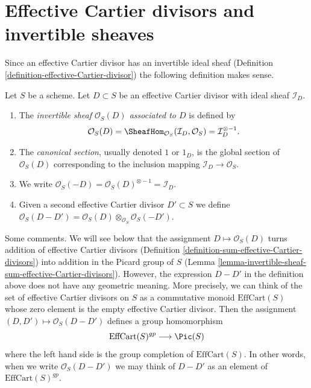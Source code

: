 \section{Effective Cartier divisors and invertible sheaves}
\label{section-effective-Cartier-invertible}

\noindent
Since an effective Cartier divisor has an invertible ideal sheaf
(Definition \ref{definition-effective-Cartier-divisor}) the
following definition makes sense.

\begin{definition}
\label{definition-invertible-sheaf-effective-Cartier-divisor}
Let $S$ be a scheme. Let $D \subset S$ be an effective Cartier divisor
with ideal sheaf $\mathcal{I}_D$.
\begin{enumerate}
\item The {\it invertible sheaf $\mathcal{O}_S(D)$ associated to $D$}
is defined by
$$
\mathcal{O}_S(D) =
\SheafHom_{\mathcal{O}_S}(\mathcal{I}_D, \mathcal{O}_S) =
\mathcal{I}_D^{\otimes -1}.
$$
\item The {\it canonical section}, usually denoted $1$ or $1_D$, is the
global section of $\mathcal{O}_S(D)$ corresponding to
the inclusion mapping $\mathcal{I}_D \to \mathcal{O}_S$.
\item We write
$\mathcal{O}_S(-D) = \mathcal{O}_S(D)^{\otimes -1} = \mathcal{I}_D$.
\item Given a second effective Cartier divisor $D' \subset S$ we define
$\mathcal{O}_S(D - D') =
\mathcal{O}_S(D) \otimes_{\mathcal{O}_S} \mathcal{O}_S(-D')$.
\end{enumerate}
\end{definition}

\noindent
Some comments. We will see below that the assignment
$D \mapsto \mathcal{O}_S(D)$ turns addition of effective Cartier
divisors (Definition \ref{definition-sum-effective-Cartier-divisors})
into addition in the Picard group of $S$
(Lemma \ref{lemma-invertible-sheaf-sum-effective-Cartier-divisors}).
However, the expression $D - D'$ in the definition above does not
have any geometric meaning. More precisely, we can think of the
set of effective Cartier divisors on $S$ as a commutative monoid
$\text{EffCart}(S)$ whose zero element is the empty effective Cartier divisor.
Then the assignment $(D, D') \mapsto \mathcal{O}_S(D - D')$ defines
a group homomorphism
$$
\text{EffCart}(S)^{gp} \longrightarrow \Pic(S)
$$
where the left hand side is the group completion of
$\text{EffCart}(S)$. In other words, when we write $\mathcal{O}_S(D - D')$
we may think of $D - D'$ as an element of $\text{EffCart}(S)^{gp}$.

